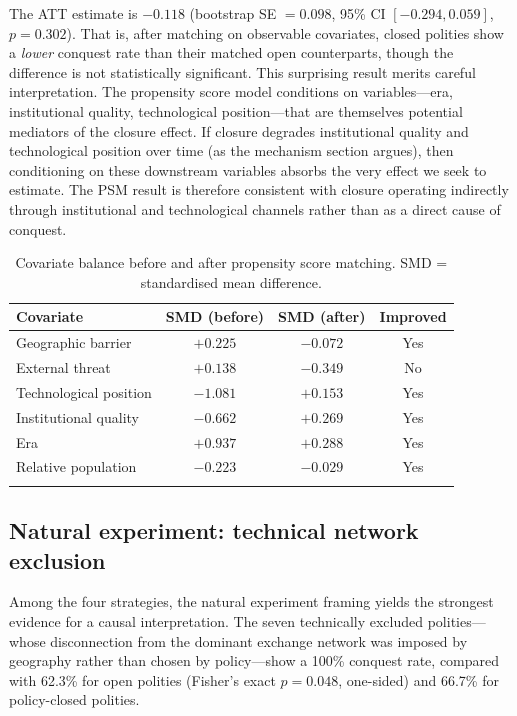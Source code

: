 \documentclass[pdflatex,sn-basic]{sn-jnl}
\theoremstyle{thmstyleone}%
\theoremstyle{thmstyletwo}%
\theoremstyle{thmstylethree}%
\begin{document}
The ATT estimate is $-0.118$ (bootstrap SE $= 0.098$, 95\% CI $[-0.294, 0.059]$, $p = 0.302$). That is, after matching on observable covariates, closed polities show a \emph{lower} conquest rate than their matched open counterparts, though the difference is not statistically significant. This surprising result merits careful interpretation. The propensity score model conditions on variables---era, institutional quality, technological position---that are themselves potential mediators of the closure effect. If closure degrades institutional quality and technological position over time (as the mechanism section argues), then conditioning on these downstream variables absorbs the very effect we seek to estimate. The PSM result is therefore consistent with closure operating indirectly through institutional and technological channels rather than as a direct cause of conquest.

\begin{table}[htbp]
\caption{Covariate balance before and after propensity score matching. SMD = standardised mean difference.}
\label{tab:psm-balance}
\begin{tabular*}{\textwidth}{@{\extracolsep\fill}lccc}
\toprule
Covariate & SMD (before) & SMD (after) & Improved \\
\midrule
Geographic barrier & $+0.225$ & $-0.072$ & Yes \\
External threat & $+0.138$ & $-0.349$ & No \\
Technological position & $-1.081$ & $+0.153$ & Yes \\
Institutional quality & $-0.662$ & $+0.269$ & Yes \\
Era & $+0.937$ & $+0.288$ & Yes \\
Relative population & $-0.223$ & $-0.029$ & Yes \\
\botrule
\end{tabular*}
\end{table}

\subsection{Natural experiment: technical network exclusion}\label{sec:causal-natexp}

Among the four strategies, the natural experiment framing yields the strongest evidence for a causal interpretation. The seven technically excluded polities---whose disconnection from the dominant exchange network was imposed by geography rather than chosen by policy---show a 100\% conquest rate, compared with 62.3\% for open polities (Fisher's exact $p = 0.048$, one-sided) and 66.7\% for policy-closed polities.
\end{document}
